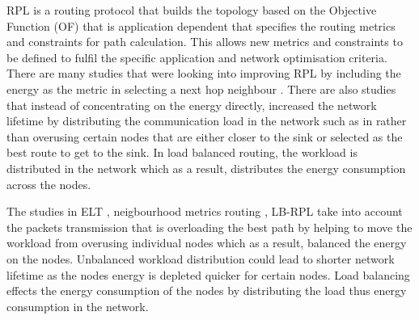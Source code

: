 

RPL is a routing protocol that builds the topology based on the Objective Function (OF) that is application dependent that specifies the routing metrics and constraints for path calculation.
This allows new metrics and constraints to be defined to fulfil the specific application and network optimisation criteria. 
There are many studies that were looking into improving RPL by including the energy as the metric in selecting a next hop neighbour \cite{energyrpl, energyLHC, elt, customOF, roee, compositeMetric, caof}.
There are also studies that instead of concentrating on the energy directly, increased the network lifetime by distributing the communication load in the network such as in \cite{loadbalance, spreadload} rather than overusing certain nodes that are either closer to the sink or selected as the best route to get to the sink.
In load balanced routing, the workload is distributed in the network which as a result, distributes the energy consumption across the nodes. 

The studies in ELT \cite{elt}, neigbourhood metrics routing \cite{spreadload}, LB-RPL \cite{loadbalance} take into account the packets transmission that is overloading the best path by helping to move the workload from overusing individual nodes which as a result, balanced the energy on the nodes. Unbalanced workload distribution could lead to shorter network lifetime as the nodes energy is depleted quicker for certain nodes. Load balancing effects the energy consumption of the nodes by distributing the load thus energy consumption in the network.

